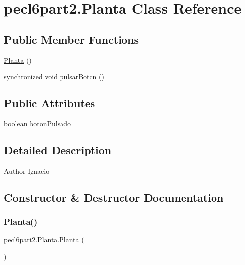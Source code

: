 \hypertarget{classpecl6part2_1_1_planta}{}\section{pecl6part2.\+Planta Class Reference}
\label{classpecl6part2_1_1_planta}
\subsection*{Public Member Functions}
\begin{DoxyCompactItemize}
\item 
\mbox{\hyperlink{classpecl6part2_1_1_planta_a6bca9c9106f186a8d40cee3893788568}{Planta}} ()
\item 
synchronized void \mbox{\hyperlink{classpecl6part2_1_1_planta_a09569038a4c6626b58213853f0c58f06}{pulsar\+Boton}} ()
\end{DoxyCompactItemize}
\subsection*{Public Attributes}
\begin{DoxyCompactItemize}
\item 
boolean \mbox{\hyperlink{classpecl6part2_1_1_planta_a6c974e390e1529f4843495bc1b19495b}{boton\+Pulsado}}
\end{DoxyCompactItemize}


\subsection{Detailed Description}
\begin{DoxyAuthor}{Author}
Ignacio 
\end{DoxyAuthor}


\subsection{Constructor \& Destructor Documentation}
\mbox{\label{classpecl6part2_1_1_planta_a6bca9c9106f186a8d40cee3893788568}} 
\subsubsection{\texorpdfstring{Planta()}{Planta()}}
{\footnotesize\ttfamily pecl6part2.\+Planta.\+Planta (\begin{DoxyParamCaption}{ }\end{DoxyParamCaption})\hspace{0.3cm}{\ttfamily [inline]}}


